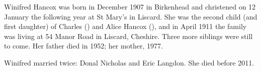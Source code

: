 
Winifred Hancox was born in December 1907 in Birkenhead and christened on 12 January the following year at St Mary's in Liscard. She was the second child (and first daughter) of Charles () and Alice Hancox (), and in April 1911 the family was living at 54 Manor Road in Liscard, Cheshire. Three more siblings were still to come. Her father died in 1952; her mother, 1977.

Winifred married twice: Donal Nicholas and Eric Langdon. She died before 2011.

\begin{references}




\end{references}